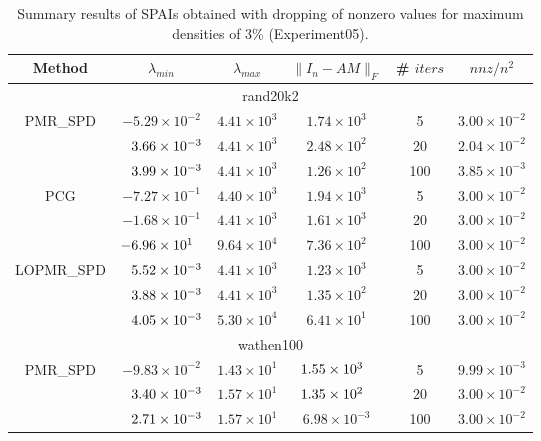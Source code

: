\documentclass[numbers,webpdf,imanum]{ima-authoring-template}%
\theoremstyle{thmstyletwo}%
\numberwithin{equation}{section}
\begin{document}
\begin{table}
\caption{Summary results of SPAIs obtained with dropping of nonzero values for maximum densities of 3\% (Experiment05).}
\label{tab:with-dropping-summary-2}
\begin{tabular}{cccccc}
\toprule
Method & $\lambda_{min}$                   & $\lambda_{max}$                  & $\|I_n-AM\|_F$             &
\# $iters$ & $nnz/n^2$\\
\midrule
\multicolumn{6}{c}{rand20k2}\\
\multirow{3}{*}{PMR\_SPD} 
& $-5.29\times 10^{-2}$ & $4.41\times 10^{3}$ & $1.74\times 10^{3}$ & 5 & $3.00\times 10^{-2}$\\
& $\hphantom{-}3.66\times 10^{-3}$ & $4.41\times 10^{3}$ & $2.48\times 10^{2}$ & 20 & $2.04\times 10^{-2}$\\
& $\hphantom{-}3.99\times 10^{-3}$ & $4.41\times 10^{3}$ & $1.26\times 10^{2}$ & 100 & $3.85\times 10^{-3}$\\
\cmidrule{2-6}
\multirow{3}{*}{PCG} 
& $-7.27\times 10^{-1}$ & $4.40\times 10^{3}$ & $1.94\times 10^{3}$ & 5 & $3.00\times 10^{-2}$\\
& $-1.68\times 10^{-1}$ & $4.41\times 10^{3}$ & $1.61\times 10^{3}$ & 20 & $3.00\times 10^{-2}$\\
& $-6.96\times 10^{1\hphantom{-}}$ & $9.64\times 10^{4}$ & $7.36\times 10^{2}$ & 100 & $3.00\times 10^{-2}$\\
\cmidrule{2-6}
\multirow{3}{*}{LOPMR\_SPD} 
& $\hphantom{-}5.52\times 10^{-3}$ & $4.41\times 10^{3}$ & $1.23\times 10^{3}$ & 5 & $3.00\times 10^{-2}$\\
& $\hphantom{-}3.88\times 10^{-3}$ & $4.41\times 10^{3}$ & $1.35\times 10^{2}$ & 20 & $3.00\times 10^{-2}$\\
& $\hphantom{-}4.05\times 10^{-3}$ & $5.30\times 10^{4}$ & $6.41\times 10^{1}$ & 100 & $3.00\times 10^{-2}$\\
\midrule
\multicolumn{6}{c}{wathen100}\\
\multirow{3}{*}{PMR\_SPD} 
& $-9.83\times 10^{-2}$ & $1.43\times 10^{1}$ & $1.55\times 10^{3\hphantom{-}}$ & 5 & $9.99\times 10^{-3}$\\
& $\hphantom{-}3.40\times 10^{-3}$ & $1.57\times 10^{1}$ & $1.35\times 10^{2\hphantom{-}}$ & 20 & $3.00\times 10^{-2}$\\
& $\hphantom{-}2.71\times 10^{-3}$ & $1.57\times 10^{1}$ & $6.98\times 10^{-3}$ & 100 & $3.00\times 10^{-2}$\\

\end{tabular}
\end{table}
\end{document}
